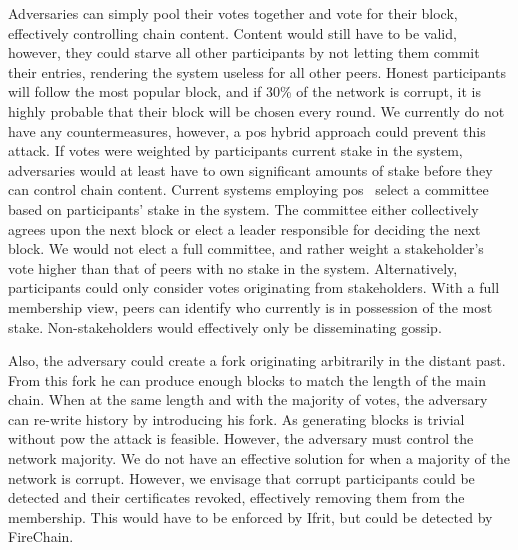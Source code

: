 \documentclass[USenglish]{uit-thesis}
\begin{document}
Adversaries can simply pool their votes together and vote for their block, effectively controlling chain content.
Content would still have to be valid, however, they could starve all other participants by not letting them commit their entries, rendering the system useless for all other peers.
Honest participants will follow the most popular block, and if 30\% of the network is corrupt, it is highly probable that their block will be chosen every round.
We currently do not have any countermeasures, however, a \gls{pos} hybrid approach could prevent this attack.
If votes were weighted by participants current stake in the system, adversaries would at least have to own significant amounts of stake before they can control chain content.
Current systems employing \gls{pos} \cite{algorand, provepos} select a committee based on participants' stake in the system.
The committee either collectively agrees upon the next block or elect a leader responsible for deciding the next block.
We would not elect a full committee, and rather weight a stakeholder's vote higher than that of peers with no stake in the system.
Alternatively, participants could only consider votes originating from stakeholders.
With a full membership view, peers can identify who currently is in possession of the most stake.
Non-stakeholders would effectively only be disseminating gossip.


Also, the adversary could create a fork originating arbitrarily in the distant past.
From this fork he can produce enough blocks to match the length of the main chain.
When at the same length and with the majority of votes, the adversary can re-write history by introducing his fork.
As generating blocks is trivial without \gls{pow} the attack is feasible. 
However, the adversary must control the network majority.
We do not have an effective solution for when a majority of the network is corrupt.
However, we envisage that corrupt participants could be detected and their certificates revoked, effectively removing them from the membership.
This would have to be enforced by Ifrit, but could be detected by FireChain.



\iffalse
\end{document}
